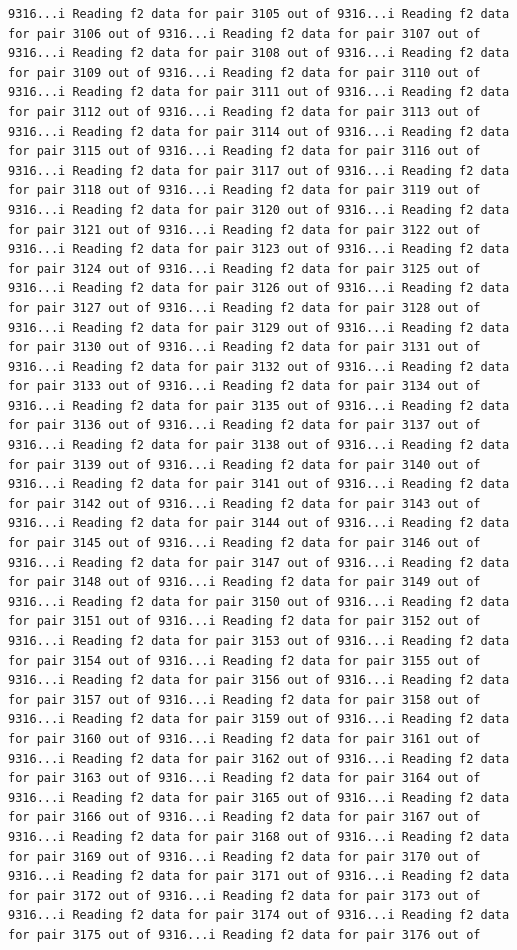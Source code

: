 \documentclass[
]{article}
\begin{document}
\begin{verbatim}
9316...i Reading f2 data for pair 3105 out of 9316...i Reading f2 data for pair 3106 out of 9316...i Reading f2 data for pair 3107 out of 9316...i Reading f2 data for pair 3108 out of 9316...i Reading f2 data for pair 3109 out of 9316...i Reading f2 data for pair 3110 out of 9316...i Reading f2 data for pair 3111 out of 9316...i Reading f2 data for pair 3112 out of 9316...i Reading f2 data for pair 3113 out of 9316...i Reading f2 data for pair 3114 out of 9316...i Reading f2 data for pair 3115 out of 9316...i Reading f2 data for pair 3116 out of 9316...i Reading f2 data for pair 3117 out of 9316...i Reading f2 data for pair 3118 out of 9316...i Reading f2 data for pair 3119 out of 9316...i Reading f2 data for pair 3120 out of 9316...i Reading f2 data for pair 3121 out of 9316...i Reading f2 data for pair 3122 out of 9316...i Reading f2 data for pair 3123 out of 9316...i Reading f2 data for pair 3124 out of 9316...i Reading f2 data for pair 3125 out of 9316...i Reading f2 data for pair 3126 out of 9316...i Reading f2 data for pair 3127 out of 9316...i Reading f2 data for pair 3128 out of 9316...i Reading f2 data for pair 3129 out of 9316...i Reading f2 data for pair 3130 out of 9316...i Reading f2 data for pair 3131 out of 9316...i Reading f2 data for pair 3132 out of 9316...i Reading f2 data for pair 3133 out of 9316...i Reading f2 data for pair 3134 out of 9316...i Reading f2 data for pair 3135 out of 9316...i Reading f2 data for pair 3136 out of 9316...i Reading f2 data for pair 3137 out of 9316...i Reading f2 data for pair 3138 out of 9316...i Reading f2 data for pair 3139 out of 9316...i Reading f2 data for pair 3140 out of 9316...i Reading f2 data for pair 3141 out of 9316...i Reading f2 data for pair 3142 out of 9316...i Reading f2 data for pair 3143 out of 9316...i Reading f2 data for pair 3144 out of 9316...i Reading f2 data for pair 3145 out of 9316...i Reading f2 data for pair 3146 out of 9316...i Reading f2 data for pair 3147 out of 9316...i Reading f2 data for pair 3148 out of 9316...i Reading f2 data for pair 3149 out of 9316...i Reading f2 data for pair 3150 out of 9316...i Reading f2 data for pair 3151 out of 9316...i Reading f2 data for pair 3152 out of 9316...i Reading f2 data for pair 3153 out of 9316...i Reading f2 data for pair 3154 out of 9316...i Reading f2 data for pair 3155 out of 9316...i Reading f2 data for pair 3156 out of 9316...i Reading f2 data for pair 3157 out of 9316...i Reading f2 data for pair 3158 out of 9316...i Reading f2 data for pair 3159 out of 9316...i Reading f2 data for pair 3160 out of 9316...i Reading f2 data for pair 3161 out of 9316...i Reading f2 data for pair 3162 out of 9316...i Reading f2 data for pair 3163 out of 9316...i Reading f2 data for pair 3164 out of 9316...i Reading f2 data for pair 3165 out of 9316...i Reading f2 data for pair 3166 out of 9316...i Reading f2 data for pair 3167 out of 9316...i Reading f2 data for pair 3168 out of 9316...i Reading f2 data for pair 3169 out of 9316...i Reading f2 data for pair 3170 out of 9316...i Reading f2 data for pair 3171 out of 9316...i Reading f2 data for pair 3172 out of 9316...i Reading f2 data for pair 3173 out of 9316...i Reading f2 data for pair 3174 out of 9316...i Reading f2 data for pair 3175 out of 9316...i Reading f2 data for pair 3176 out of 
\end{verbatim}
\end{document}
